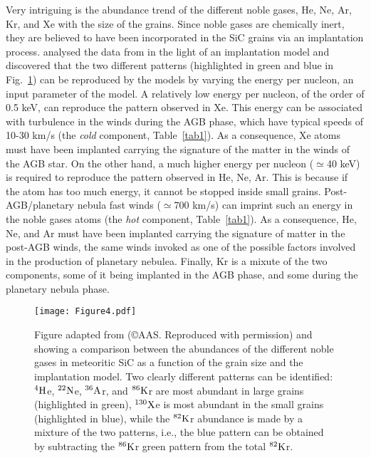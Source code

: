 \documentclass{iau}
\newcommand{\iso}[2]{\hbox{${}^{#1}{\rm #2}$}}
\begin{document}
Very intriguing is the abundance trend of the different noble gases, He, Ne, 
Ar, Kr, and Xe with the size of the grains. Since noble gases are chemically 
inert, they are believed to have been incorporated in the SiC grains via an 
implantation process. 
\citet{verchovsky04} analysed the data from \cite{lewis94} in 
the light of an implantation model and discovered that the two 
different patterns (highlighted in green and blue in Fig.~\ref{fig4}) can be reproduced by 
the models by varying the energy per nucleon, an input parameter of the model. 
A relatively low energy per nucleon, of the order of 0.5 keV, can reproduce the pattern 
observed in Xe. This energy can be associated with turbulence in the winds during 
the AGB phase, which have typical speeds of 10-30 km/s (the {\em cold} component, 
Table~\ref{tab1}). As 
a consequence, Xe atoms must have been implanted carrying the signature of the matter 
in the winds of the AGB star. On the other hand, a much higher energy per nucleon 
($\simeq$40 keV) is required to reproduce the pattern observed in He, Ne, Ar. This is 
because if the atom has too much energy, it cannot be stopped inside small grains. 
Post-AGB/planetary nebula fast winds ($\simeq$700 km/s) 
can imprint such an energy in the noble gases atoms (the {\em hot} component, 
Table~\ref{tab1}). As a 
consequence, He, Ne, and Ar must have been implanted carrying the signature of matter 
in the post-AGB winds, the same winds invoked as one of the 
possible factors involved in the production of planetary nebulea.
Finally, Kr is a mixute of the two components, some of it being implanted in 
the AGB phase, and some during the planetary nebula phase.

\begin{figure}[h]
\begin{center}
 \texttt{[image: Figure4.pdf]} 
 \caption{Figure adapted from \citet{verchovsky04} 
(\copyright AAS. Reproduced with permission)
and showing a comparison between 
the abundances of the different noble gases in meteoritic SiC as a function of the grain 
size \citep[from][]{lewis94} and the implantation model. Two clearly different patterns 
can be identified: \iso{4}He, \iso{22}Ne, \iso{36}Ar, and \iso{86}Kr are most abundant in 
large grains (highlighted in green), \iso{130}Xe is most abundant in the small grains
(highlighted in blue), while the \iso{82}Kr 
abundance is made by a mixture of the two patterns, i.e., the blue pattern 
can be obtained
by subtracting the \iso{86}Kr green pattern from the total \iso{82}Kr.}
   \label{fig4}
\end{center}
\end{figure}
\end{document}
